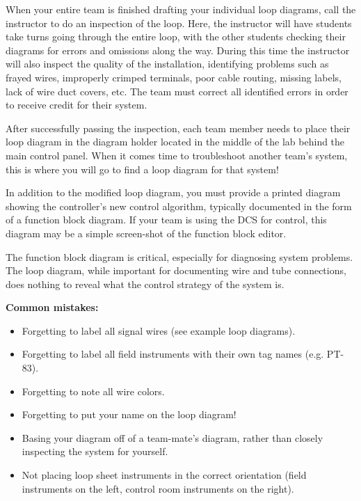 When your entire team is finished drafting your individual loop diagrams, call the instructor to do an inspection of the loop.  Here, the instructor will have students take turns going through the entire loop, with the other students checking their diagrams for errors and omissions along the way.  During this time the instructor will also inspect the quality of the installation, identifying problems such as frayed wires, improperly crimped terminals, poor cable routing, missing labels, lack of wire duct covers, etc.  The team must correct all identified errors in order to receive credit for their system.  

After successfully passing the inspection, each team member needs to place their loop diagram in the diagram holder located in the middle of the lab behind the main control panel.  When it comes time to troubleshoot another team's system, this is where you will go to find a loop diagram for that system!

\vskip 10pt

In addition to the modified loop diagram, you must provide a printed diagram showing the controller's new control algorithm, typically documented in the form of a function block diagram.  If your team is using the DCS for control, this diagram may be a simple screen-shot of the function block editor.

The function block diagram is critical, especially for diagnosing system problems.  The loop diagram, while important for documenting wire and tube connections, does nothing to reveal what the control strategy of the system is. 

\vskip 10pt

{\bf Common mistakes:}

\begin{itemize}
\item{} Forgetting to label all signal wires (see example loop diagrams).
\item{} Forgetting to label all field instruments with their own tag names (e.g. PT-83).
\item{} Forgetting to note all wire colors.
\item{} Forgetting to put your name on the loop diagram!
\item{} Basing your diagram off of a team-mate's diagram, rather than closely inspecting the system for yourself.
\item{} Not placing loop sheet instruments in the correct orientation (field instruments on the left, control room instruments on the right).
\end{itemize}

